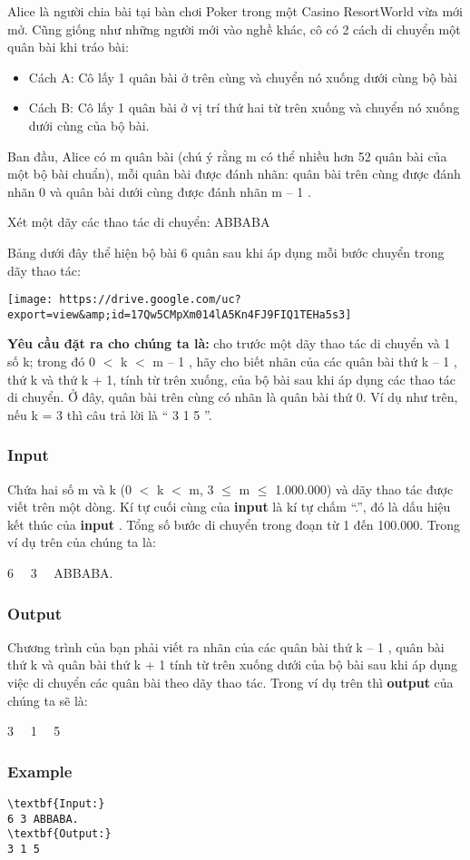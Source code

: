 

Alice là người chia bài tại bàn chơi Poker trong một Casino ResortWorld vừa mới mở. Cũng giống như những người mới vào nghề khác, cô có 2 cách di chuyển một quân bài khi tráo bài:
\begin{itemize}
	\item Cách A: Cô lấy 1 quân bài ở trên cùng và chuyển nó xuống dưới cùng bộ bài
	\item Cách B: Cô lấy 1 quân bài ở vị trí thứ hai từ trên xuống và chuyển nó xuống dưới cùng của bộ bài.
\end{itemize}

Ban đầu, Alice có m quân bài (chú ý rằng m có thể nhiều hơn 52 quân bài của một bộ bài chuẩn), mỗi quân bài được đánh nhãn: quân bài trên cùng được đánh nhãn 0 và quân bài dưới cùng được đánh nhãn m – 1 .

Xét một dãy các thao tác di chuyển: ABBABA

Bảng dưới đây thể hiện bộ bài 6 quân sau khi áp dụng mỗi bước chuyển trong dãy thao tác:


\texttt{[image: https://drive.google.com/uc?export=view\&amp;id=17Qw5CMpXm014lA5Kn4FJ9FIQ1TEHa5s3]}

\textbf{Yêu cầu đặt ra cho chúng ta là: } cho trước một dãy thao tác di chuyển và 1 số k; trong đó 0 $<$ k $<$ m – 1 , hãy cho biết nhãn của các quân bài thứ k – 1 , thứ k và thứ k + 1, tính từ trên xuống, của bộ bài sau khi áp dụng các thao tác di chuyển. Ở đây, quân bài trên cùng có nhãn là quân bài thứ 0. Ví dụ như trên, nếu k = 3 thì câu trả lời là “ 3 1 5 ”.

\subsubsection{Input}

Chứa hai số m và k (0 $<$ k $<$ m, 3  $\le$  m  $\le$  1.000.000) và dãy thao tác được viết trên một dòng. Kí tự cuối cùng của \textbf{input} là kí tự chấm “.”, đó là dấu hiệu kết thúc của \textbf{input} . Tổng số bước di chuyển trong đoạn từ 1 đến 100.000. Trong ví dụ trên của chúng ta là:

6   3   ABBABA.

\subsubsection{Output}

Chương trình của bạn phải viết ra nhãn của các quân bài thứ k – 1 , quân bài thứ k và quân bài thứ k + 1 tính từ trên xuống dưới của bộ bài sau khi áp dụng việc di chuyển các quân bài theo dãy thao tác. Trong ví dụ trên thì \textbf{output} của chúng ta sẽ là:

3   1   5

\subsubsection{Example}
\begin{verbatim}
\textbf{Input:}
6 3 ABBABA.
\textbf{Output:}
3 1 5\end{verbatim}
